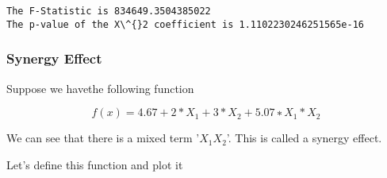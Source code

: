 \documentclass[11pt]{article}
\begin{document}
    \begin{Verbatim}[commandchars=\\\{\}]
The F-Statistic is 834649.3504385022
The p-value of the X\^{}2 coefficient is 1.1102230246251565e-16

    \end{Verbatim}

    \subsubsection{Synergy Effect}\label{synergy-effect}

Suppose we havethe following function

\[f(x)=4.67+2*X_1+3*X_2+5.07∗X_1*X_2\]

We can see that there is a mixed term '\(X_1 X_2\)'. This is called a
synergy effect.

Let's define this function and plot it
\end{document}
